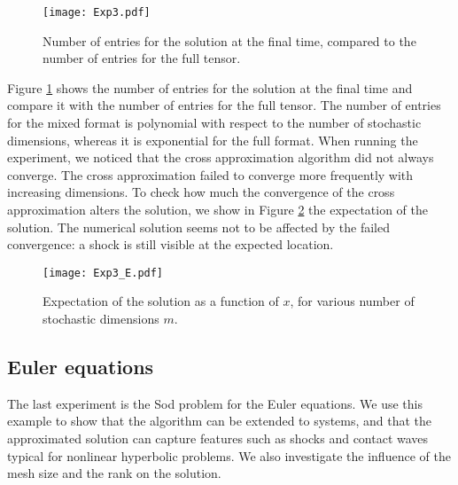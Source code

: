 \documentclass{article}
\begin{document}
\begin{figure}
    \centering
    \texttt{[image: Exp3.pdf]}
    \caption{Number of entries for the solution at the final time, compared to the number of entries for the full tensor.}
    \label{fig:Exp3}
\end{figure}
Figure \ref{fig:Exp3} shows the number of entries for the solution at the final time and compare it with the number of entries for the full tensor. 
The number of entries for the mixed format is polynomial with respect to the number of stochastic dimensions, whereas it is exponential for the full format. 
When running the experiment, we noticed that the cross approximation algorithm did not always converge. 
The cross approximation failed to converge more frequently with increasing dimensions. 
To check how much the convergence of the cross approximation alters the solution, we show in Figure \ref{fig:Exp3_E} the expectation of the solution. 
The numerical solution seems not to be  affected by the failed convergence: a shock is still visible at the expected location.
\begin{figure}
    \centering
    \texttt{[image: Exp3\_E.pdf]}
    \caption{Expectation of the solution as a function of $x$, for various number of stochastic dimensions $m$.}
    \label{fig:Exp3_E}
\end{figure}





\subsection{Euler equations}\label{sec:Euler}
The last experiment is the Sod problem for the Euler equations. 
We use this example to show that the algorithm can be extended to systems, and that the approximated solution can capture features such as  shocks and contact waves typical for nonlinear hyperbolic problems.
We also investigate the influence of the mesh size and the rank on the solution. 
\end{document}
